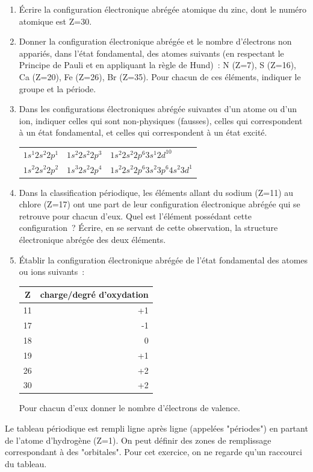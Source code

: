 \begin{enumerate}[\bf 1)]
\item \'Ecrire la configuration \'electronique abrégée atomique du zinc, dont le num\'ero 
atomique est Z=30.

\item Donner la configuration \'electronique abrégée et le nombre d'\'electrons non 
appari\'es, dans l'\'etat fondamental, des atomes suivants (en respectant le 
Principe de Pauli et en appliquant la r\`egle de Hund)~: N (Z=7), S (Z=16), 
Ca (Z=20), Fe (Z=26), Br (Z=35).
Pour chacun de ces éléments, indiquer le groupe et la période.

\item Dans les configurations \'electroniques abrégée suivantes d'un atome ou d'un ion, 
indiquer celles qui sont non-physiques (fausses), celles qui correspondent 
\`a un \'etat fondamental, et celles qui correspondent \`a un \'etat excit\'e.

\begin{center}
\begin{tabular}{lll}
$1s^1 2s^2 2p^1$ & $1s^2 2s^2 2p^3$ & $1s^2 2s^2 2p^6 3s^1 2d^{10}$         \\
$1s^2 2s^2 2p^2$ & $1s^3 2s^2 2p^4$ & $1s^2 2s^2 2p^6 3s^2 3p^6 4s^2 3d^1$  \\
\end{tabular}
\end{center}

\item Dans la classification p\'eriodique, les \'el\'ements allant du sodium 
(Z=11) au chlore (Z=17) ont une part de leur configuration \'electronique abrégée qui 
se retrouve pour chacun d'eux. Quel est l'\'el\'ement poss\'edant cette 
configuration~?  \'Ecrire, en se servant de cette observation, la structure 
\'electronique abrégée des deux \'el\'ements.

\item \'Etablir la configuration \'electronique abrégée de l'\'etat fondamental 
des atomes ou ions suivants~:

\begin{center}
\begin{tabular}{c|r}\hline
Z & charge/degré d'oxydation \\\hline
11 & +1 \\\hline
17 & -1 \\\hline
18 & 0  \\\hline
19 & +1 \\\hline
26 & +2 \\\hline
30 & +2 \\\hline
\end{tabular}
\end{center}

Pour chacun d'eux donner le nombre d'\'electrons de valence.

\end{enumerate}
%
Le tableau p\'eriodique est rempli ligne apr\`es ligne (appel\'ees "p\'eriodes") en partant
de l'atome d'hydrog\`ene (Z=1). On peut d\'efinir des zones de remplissage correspondant \`a des
"orbitales". Pour cet exercice, on ne regarde qu'un raccourci du tableau.

